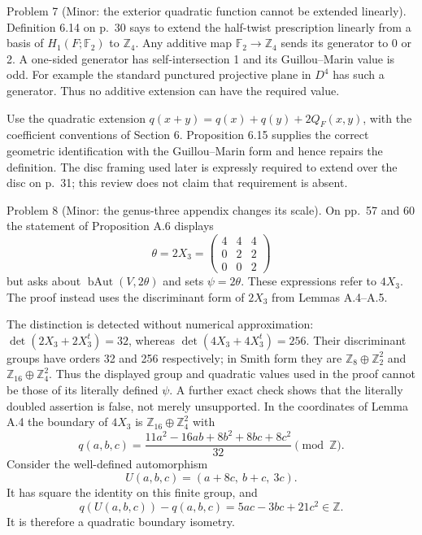 \documentclass[10pt]{article}
\begin{document}
Problem 7 (Minor: the exterior quadratic function cannot be extended linearly).  Definition 6.14 on p. 30 says to extend the half-twist prescription linearly from a basis of \(H_1(F;\mathbb F_2)\) to \(\mathbb Z_4\). Any additive map \(\mathbb F_2\to\mathbb Z_4\) sends its generator to 0 or 2. A one-sided generator has self-intersection 1 and its Guillou–Marin value is odd. For example the standard punctured projective plane in \(D^4\) has such a generator. Thus no additive extension can have the required value.\par
Use the quadratic extension \(q(x+y)=q(x)+q(y)+2Q_F(x,y)\), with the coefficient conventions of Section 6. Proposition 6.15 supplies the correct geometric identification with the Guillou–Marin form and hence repairs the definition. The disc framing used later is expressly required to extend over the disc on p. 31; this review does not claim that requirement is absent.\par
Problem 8 (Minor: the genus-three appendix changes its scale).  On pp. 57 and 60 the statement of Proposition A.6 displays \[\theta=2X_3=
 \begin{pmatrix}4&4&4\\0&2&2\\0&0&2\end{pmatrix}\] but asks about \(\operatorname{bAut}(V,2\theta)\) and sets \(\psi=2\theta\). These expressions refer to \(4X_3\). The proof instead uses the discriminant form of \(2X_3\) from Lemmas A.4–A.5.\par
The distinction is detected without numerical approximation: \(\det(2X_3+2X_3^t)=32\), whereas \(\det(4X_3+4X_3^t)=256\). Their discriminant groups have orders 32 and 256 respectively; in Smith form they are \(\mathbb Z_8\oplus\mathbb Z_2^2\) and \(\mathbb Z_{16}\oplus\mathbb Z_4^2\). Thus the displayed group and quadratic values used in the proof cannot be those of its literally defined \(\psi\). A further exact check shows that the literally doubled assertion is false, not merely unsupported. In the coordinates of Lemma A.4 the boundary of \(4X_3\) is \(\mathbb Z_{16}\oplus\mathbb Z_4^2\) with \[q(a,b,c)=\frac{11a^2-16ab+8b^2+8bc+8c^2}{32}\pmod{\mathbb Z}.\] Consider the well-defined automorphism \[U(a,b,c)=(a+8c,\ b+c,\ 3c).\] It has square the identity on this finite group, and \[q(U(a,b,c))-q(a,b,c)=5ac-3bc+21c^2\in\mathbb Z.\] It is therefore a quadratic boundary isometry.\par
\end{document}
